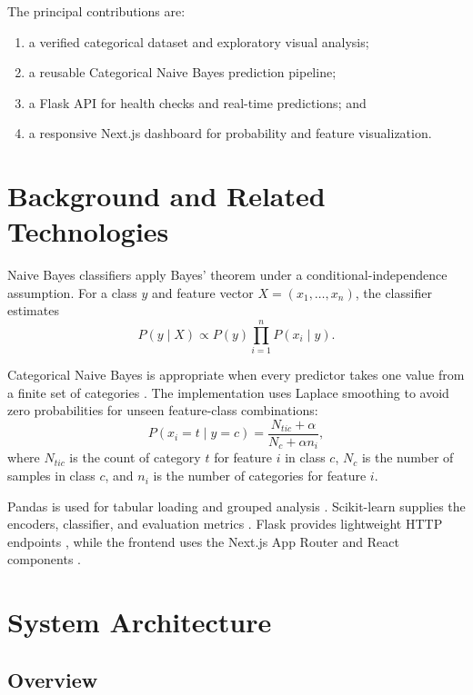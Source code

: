 \documentclass[conference]{IEEEtran}
\begin{document}
The principal contributions are:
\begin{enumerate}
    \item a verified categorical dataset and exploratory visual analysis;
    \item a reusable Categorical Naive Bayes prediction pipeline;
    \item a Flask API for health checks and real-time predictions; and
    \item a responsive Next.js dashboard for probability and feature visualization.
\end{enumerate}

\section{Background and Related Technologies}

Naive Bayes classifiers apply Bayes' theorem under a conditional-independence assumption. For a class $y$ and feature vector $X=(x_1,\ldots,x_n)$, the classifier estimates
\begin{equation}
P(y\mid X) \propto P(y)\prod_{i=1}^{n}P(x_i\mid y).
\end{equation}

Categorical Naive Bayes is appropriate when every predictor takes one value from a finite set of categories \cite{sklearn-nb}. The implementation uses Laplace smoothing to avoid zero probabilities for unseen feature-class combinations:
\begin{equation}
P(x_i=t\mid y=c)=
\frac{N_{tic}+\alpha}{N_c+\alpha n_i},
\end{equation}
where $N_{tic}$ is the count of category $t$ for feature $i$ in class $c$, $N_c$ is the number of samples in class $c$, and $n_i$ is the number of categories for feature $i$.

Pandas is used for tabular loading and grouped analysis \cite{pandas-cat}. Scikit-learn supplies the encoders, classifier, and evaluation metrics \cite{sklearn-nb}. Flask provides lightweight HTTP endpoints \cite{flask-docs}, while the frontend uses the Next.js App Router and React components \cite{nextjs-docs}.

\section{System Architecture}

\subsection{Overview}
\end{document}
